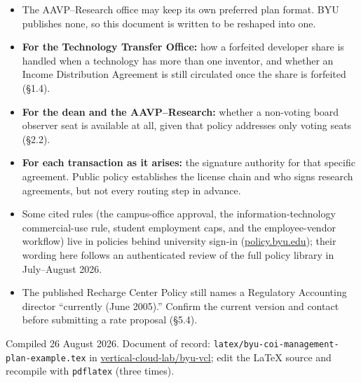 \documentclass[11pt]{article}
\begin{document}
\begin{itemize}
\item The AAVP--Research office may keep its own preferred plan format. BYU
publishes none, so this document is written to be reshaped into one.
\item \textbf{For the Technology Transfer Office:} how a forfeited developer
share is handled when a technology has more than one inventor, and whether an
Income Distribution Agreement is still circulated once the share is forfeited
(\S1.4).
\item \textbf{For the dean and the AAVP--Research:} whether a non-voting
board observer seat is available at all, given that policy addresses only
voting seats (\S2.2).
\item \textbf{For each transaction as it arises:} the signature authority for
that specific agreement. Public policy establishes the license chain and who
signs research agreements, but not every routing step in advance.
\item Some cited rules (the campus-office approval, the
information-technology commercial-use rule, student employment caps, and the
employee-vendor workflow) live in policies behind university sign-in
(\href{https://policy.byu.edu}{policy.byu.edu}); their wording here follows an
authenticated review of the full policy library in July--August 2026.
\item The published Recharge Center Policy still names a Regulatory
Accounting director ``currently (June 2005).'' Confirm the current version
and contact before submitting a rate proposal (\S5.4).
\end{itemize}

\vfill
{\color{metagray}\footnotesize\noindent
Compiled 26 August 2026. Document of record:
\texttt{latex/byu-coi-management-plan-example.tex} in
\href{https://github.com/vertical-cloud-lab/byu-vcl}{vertical-cloud-lab/byu-vcl};
edit the LaTeX source and recompile with \texttt{pdflatex} (three
times).}
\end{document}
